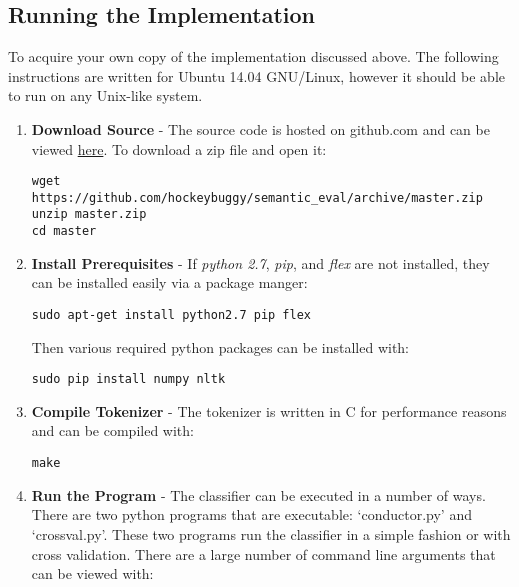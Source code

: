 \documentclass[final,3p,12pt]{elsarticle}
\begin{document}
\subsection{Running the Implementation}
\label{ssection:runningtheimplementation}

To acquire your own copy of the implementation discussed above. The following
instructions are written for Ubuntu 14.04 GNU/Linux, however it should be able
to run on any Unix-like system.

\begin{enumerate}
    \item \textbf{Download Source} - The source code is hosted on github.com
        and can be viewed
        \href{https://github.com/hockeybuggy/semantic\_eval}{here}. To download a zip
        file and open it:

\begin{Verbatim}[fontsize=\footnotesize]
wget https://github.com/hockeybuggy/semantic_eval/archive/master.zip
unzip master.zip
cd master
\end{Verbatim}


    \item \textbf{Install Prerequisites} - If \textit{python 2.7},
        \textit{pip}, and \textit{flex} are not installed, they can be
        installed easily via a package manger:

\begin{Verbatim}[fontsize=\footnotesize]
sudo apt-get install python2.7 pip flex
\end{Verbatim}

Then various required python packages can be installed with:

\begin{Verbatim}[fontsize=\footnotesize]
sudo pip install numpy nltk
\end{Verbatim}

    \item \textbf{Compile Tokenizer} - The tokenizer is written in C for
        performance reasons and can be compiled with:
\begin{Verbatim}[fontsize=\footnotesize]
make
\end{Verbatim}

    \item \textbf{Run the Program} - The classifier can be executed in a number
        of ways. There are two python programs that are executable:
        `conductor.py' and `crossval.py'. These two programs run the classifier
        in a simple fashion or with cross validation. There are a large number
        of command line arguments that can be viewed with:


\end{enumerate}
\end{document}
